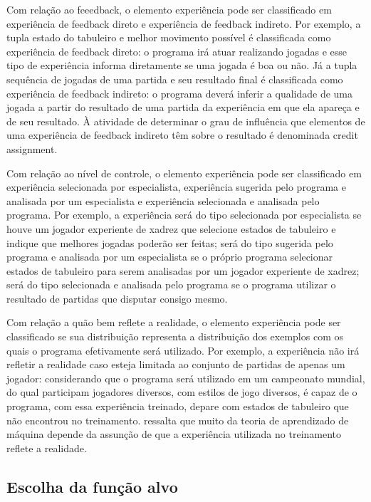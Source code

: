 Com relação ao feeedback, o elemento experiência pode ser classificado em experiência de feedback direto e experiência de feedback indireto. Por exemplo, a tupla estado do tabuleiro e melhor movimento possível é classificada como experiência de feedback direto: o programa irá atuar realizando jogadas e esse tipo de experiência informa diretamente se uma jogada é boa ou não. Já a tupla sequência de jogadas de uma partida e seu resultado final é classificada como experiência de feedback indireto: o programa deverá inferir a qualidade de uma jogada a partir do resultado de uma partida da experiência em que ela apareça e de seu resultado. À atividade de determinar o grau de influência que elementos de uma experiência de feedback indireto têm sobre o resultado é denominada credit assignment.

Com relação ao nível de controle, o elemento experiência pode ser classificado em experiência selecionada por especialista, experiência sugerida pelo programa e analisada por um especialista e experiência selecionada e analisada pelo programa. Por exemplo, a experiência será do tipo selecionada por especialista se houve um jogador experiente de xadrez que selecione estados de tabuleiro e indique que melhores jogadas poderão ser feitas; será do tipo sugerida pelo programa e analisada por um especialista se o próprio programa selecionar estados de tabuleiro para serem analisadas por um jogador experiente de xadrez; será do tipo selecionada e analisada pelo programa se o programa utilizar o resultado de partidas que disputar consigo mesmo.

Com relação a quão bem reflete a realidade, o elemento experiência pode ser classificado se sua distribuição representa a distribuição dos exemplos com os quais o programa efetivamente será utilizado. Por exemplo, a experiência não irá refletir a realidade caso esteja limitada ao conjunto de partidas de apenas um jogador: considerando que o programa será utilizado em um campeonato mundial, do qual participam jogadores diversos, com estilos de jogo diversos, é capaz de o programa, com essa experiência treinado, depare com estados de tabuleiro que não encontrou no treinamento. \cite{Tom_mitchell} ressalta que muito da teoria de aprendizado de máquina depende da assunção de que a experiência utilizada no treinamento reflete a realidade.

\subsection*{Escolha da função alvo}

